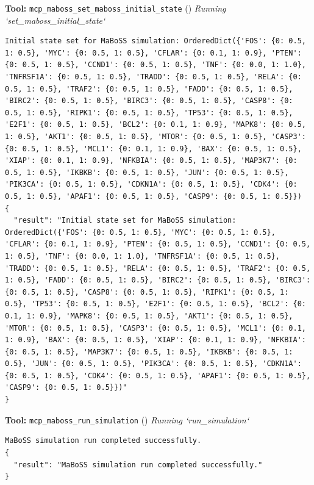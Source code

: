 \documentclass[11pt,a4paper]{article}
\begin{document}
\begin{toolokbox}
\textbf{Tool:} \texttt{mcp\_maboss\_set\_maboss\_initial\_state} (\checkmark)
\textit{Running `set\_maboss\_initial\_state`}
\begin{lstlisting}
Initial state set for MaBoSS simulation: OrderedDict({'FOS': {0: 0.5, 1: 0.5}, 'MYC': {0: 0.5, 1: 0.5}, 'CFLAR': {0: 0.1, 1: 0.9}, 'PTEN': {0: 0.5, 1: 0.5}, 'CCND1': {0: 0.5, 1: 0.5}, 'TNF': {0: 0.0, 1: 1.0}, 'TNFRSF1A': {0: 0.5, 1: 0.5}, 'TRADD': {0: 0.5, 1: 0.5}, 'RELA': {0: 0.5, 1: 0.5}, 'TRAF2': {0: 0.5, 1: 0.5}, 'FADD': {0: 0.5, 1: 0.5}, 'BIRC2': {0: 0.5, 1: 0.5}, 'BIRC3': {0: 0.5, 1: 0.5}, 'CASP8': {0: 0.5, 1: 0.5}, 'RIPK1': {0: 0.5, 1: 0.5}, 'TP53': {0: 0.5, 1: 0.5}, 'E2F1': {0: 0.5, 1: 0.5}, 'BCL2': {0: 0.1, 1: 0.9}, 'MAPK8': {0: 0.5, 1: 0.5}, 'AKT1': {0: 0.5, 1: 0.5}, 'MTOR': {0: 0.5, 1: 0.5}, 'CASP3': {0: 0.5, 1: 0.5}, 'MCL1': {0: 0.1, 1: 0.9}, 'BAX': {0: 0.5, 1: 0.5}, 'XIAP': {0: 0.1, 1: 0.9}, 'NFKBIA': {0: 0.5, 1: 0.5}, 'MAP3K7': {0: 0.5, 1: 0.5}, 'IKBKB': {0: 0.5, 1: 0.5}, 'JUN': {0: 0.5, 1: 0.5}, 'PIK3CA': {0: 0.5, 1: 0.5}, 'CDKN1A': {0: 0.5, 1: 0.5}, 'CDK4': {0: 0.5, 1: 0.5}, 'APAF1': {0: 0.5, 1: 0.5}, 'CASP9': {0: 0.5, 1: 0.5}})
{
  "result": "Initial state set for MaBoSS simulation: OrderedDict({'FOS': {0: 0.5, 1: 0.5}, 'MYC': {0: 0.5, 1: 0.5}, 'CFLAR': {0: 0.1, 1: 0.9}, 'PTEN': {0: 0.5, 1: 0.5}, 'CCND1': {0: 0.5, 1: 0.5}, 'TNF': {0: 0.0, 1: 1.0}, 'TNFRSF1A': {0: 0.5, 1: 0.5}, 'TRADD': {0: 0.5, 1: 0.5}, 'RELA': {0: 0.5, 1: 0.5}, 'TRAF2': {0: 0.5, 1: 0.5}, 'FADD': {0: 0.5, 1: 0.5}, 'BIRC2': {0: 0.5, 1: 0.5}, 'BIRC3': {0: 0.5, 1: 0.5}, 'CASP8': {0: 0.5, 1: 0.5}, 'RIPK1': {0: 0.5, 1: 0.5}, 'TP53': {0: 0.5, 1: 0.5}, 'E2F1': {0: 0.5, 1: 0.5}, 'BCL2': {0: 0.1, 1: 0.9}, 'MAPK8': {0: 0.5, 1: 0.5}, 'AKT1': {0: 0.5, 1: 0.5}, 'MTOR': {0: 0.5, 1: 0.5}, 'CASP3': {0: 0.5, 1: 0.5}, 'MCL1': {0: 0.1, 1: 0.9}, 'BAX': {0: 0.5, 1: 0.5}, 'XIAP': {0: 0.1, 1: 0.9}, 'NFKBIA': {0: 0.5, 1: 0.5}, 'MAP3K7': {0: 0.5, 1: 0.5}, 'IKBKB': {0: 0.5, 1: 0.5}, 'JUN': {0: 0.5, 1: 0.5}, 'PIK3CA': {0: 0.5, 1: 0.5}, 'CDKN1A': {0: 0.5, 1: 0.5}, 'CDK4': {0: 0.5, 1: 0.5}, 'APAF1': {0: 0.5, 1: 0.5}, 'CASP9': {0: 0.5, 1: 0.5}})"
}
\end{lstlisting}
\end{toolokbox}
\begin{toolokbox}
\textbf{Tool:} \texttt{mcp\_maboss\_run\_simulation} (\checkmark)
\textit{Running `run\_simulation`}
\begin{lstlisting}
MaBoSS simulation run completed successfully.
{
  "result": "MaBoSS simulation run completed successfully."
}
\end{lstlisting}
\end{toolokbox}
\end{document}
